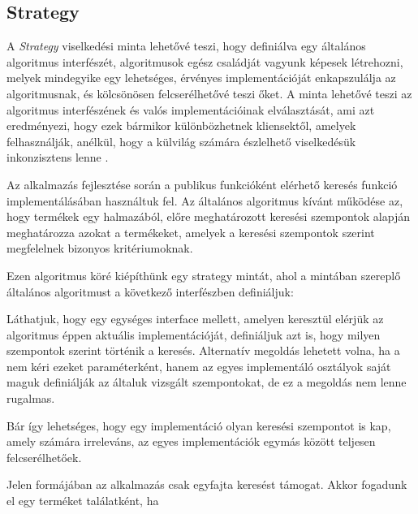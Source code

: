 \subsection{Strategy}

A \emph{Strategy} viselkedési minta lehetővé teszi, hogy definiálva egy általános algoritmus interfészét, algoritmusok egész családját vagyunk képesek létrehozni, melyek mindegyike egy lehetséges, érvényes implementációját enkapszulálja az algoritmusnak, és kölcsönösen felcserélhetővé teszi őket. A minta lehetővé teszi az algoritmus interfészének és valós implementációinak elválasztását, ami azt eredményezi, hogy ezek bármikor különbözhetnek kliensektől, amelyek felhasználják, anélkül, hogy a külvilág számára észlelhető viselkedésük inkonzisztens lenne \cite{gamma1995elements}. \par


Az alkalmazás fejlesztése során a publikus funkcióként elérhető keresés funkció implementálásában használtuk fel. Az általános algoritmus kívánt működése az, hogy termékek egy halmazából, előre meghatározott keresési szempontok alapján meghatározza azokat a termékeket, amelyek a keresési szempontok szerint megfelelnek bizonyos kritériumoknak. \par

Ezen algoritmus köré kiépíthünk egy strategy mintát, ahol a mintában szereplő általános algoritmust a következő interfészben definiáljuk: 


Láthatjuk, hogy egy egységes interface mellett, amelyen keresztül elérjük az algoritmus éppen aktuális implementációját, definiáljuk azt is, hogy milyen szempontok szerint történik a keresés. Alternatív megoldás lehetett volna, ha a  nem kéri ezeket paraméterként, hanem az egyes implementáló osztályok saját maguk definiálják az általuk vizsgált szempontokat, de ez a megoldás nem lenne rugalmas. \par

 Bár így lehetséges, hogy egy implementáció olyan keresési szempontot is kap, amely számára irreleváns, az egyes implementációk egymás között teljesen felcserélhetőek. \par
 
 Jelen formájában az alkalmazás csak egyfajta keresést támogat. Akkor fogadunk el egy terméket találatként, ha
 
